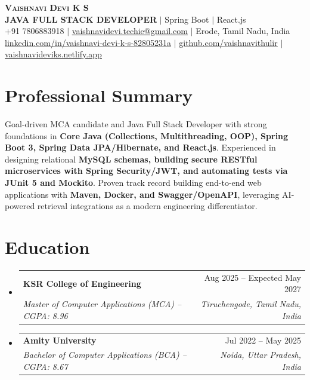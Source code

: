 \documentclass[letterpaper,10pt]{article}
\makeatletter
\newcommand{\resumeSubheading}[4]{
  \vspace{-2pt}\item
    \begin{tabular*}{0.98\textwidth}[t]{l@{\extracolsep{\fill}}r}
      \textbf{#1} & #2 \\
      \textit{\small#3} & \textit{\small #4} \\
    \end{tabular*}\vspace{-4pt}
}
\newcommand{\resumeSubHeadingListStart}{\begin{itemize}[leftmargin=0.15in, label={}]}
\newcommand{\resumeSubHeadingListEnd}{\end{itemize}}
\makeatother
\begin{document}
\begin{center}
    \textbf{\Huge \scshape Vaishnavi Devi K S} \\ \vspace{2pt}
    \textbf{\large JAVA FULL STACK DEVELOPER} $|$ \small Spring Boot $|$ React.js \\ \vspace{2pt}
    \small +91 7806883918 $|$ \href{mailto:vaishnavidevi.techie@gmail.com}{\underline{vaishnavidevi.techie@gmail.com}} $|$ Erode, Tamil Nadu, India \\ \vspace{1pt}
    \href{https://linkedin.com/in/vaishnavi-devi-k-s-82805231a}{\underline{linkedin.com/in/vaishnavi-devi-k-s-82805231a}} $|$ 
    \href{https://github.com/vaishnavithulir}{\underline{github.com/vaishnavithulir}} $|$ 
    \href{https://vaishnavideviks.netlify.app/}{\underline{vaishnavideviks.netlify.app}}
\end{center}
\vspace{-10pt}

\section{Professional Summary}
\small{Goal-driven MCA candidate and Java Full Stack Developer with strong foundations in \textbf{Core Java (Collections, Multithreading, OOP), Spring Boot 3, Spring Data JPA/Hibernate, and React.js}. Experienced in designing relational \textbf{MySQL schemas, building secure RESTful microservices with Spring Security/JWT, and automating tests via JUnit 5 and Mockito}. Proven track record building end-to-end web applications with \textbf{Maven, Docker, and Swagger/OpenAPI}, leveraging AI-powered retrieval integrations as a modern engineering differentiator.}
\vspace{-3pt}

\section{Education}
  \resumeSubHeadingListStart
    \resumeSubheading
      {KSR College of Engineering}{Aug 2025 -- Expected May 2027}
      {Master of Computer Applications (MCA) -- CGPA: 8.96}{Tiruchengode, Tamil Nadu, India}
    \resumeSubheading
      {Amity University}{Jul 2022 -- May 2025}
      {Bachelor of Computer Applications (BCA) -- CGPA: 8.67}{Noida, Uttar Pradesh, India}
  \resumeSubHeadingListEnd
\vspace{-6pt}
\end{document}
